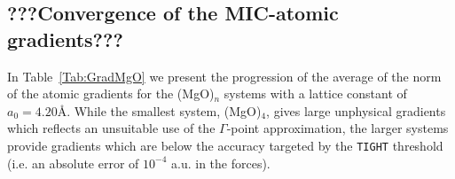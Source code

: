 \documentclass[prl,twocolumn,showpacs,twocolumngrid,superbib]{revtex4}
\begin{document}
%
%
%
%
%
%
%
%
%
%
%
%
%
%
%
%
%
\subsection{???Convergence of the MIC-atomic gradients???}
In Table~\ref{Tab:GradMgO} we present the progression of the average of the norm of the
atomic gradients for the (MgO)$_n$ systems with a lattice constant of $a_0=4.20$\AA. 
While the smallest system, (MgO)$_4$, gives 
large unphysical gradients which reflects 
an unsuitable use of the $\Gamma$-point approximation,
the larger systems provide gradients which are below the accuracy targeted by the 
{\tt TIGHT} threshold (i.e. an absolute error of $10^{-4}$ a.u. in the forces).
\end{document}
